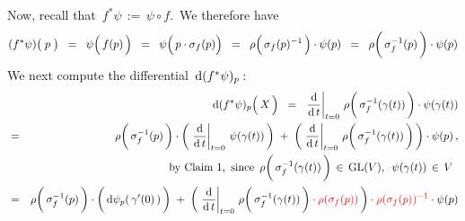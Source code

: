 \vskip 0.3cm
\noindent
Now, recall that \,$f^{*}\psi \,:=\, \psi \circ f$.\,
We therefore have
\begin{equation*}
(f^{*}\psi)\!\left(\;\overset{{\color{white}.}}{
    p
    }\;\right)
\;\; = \;\;
    \psi\!\left(\,\overset{{\color{white}.}}{
        f(p)
        }\,\right)
\;\; = \;\;
    \psi\!\left(\,\overset{{\color{white}.}}{
        p\cdot\sigma_{f}(p)
        }\right)
\;\; = \;\;
    \rho\!\left(\,\overset{{\color{white}.}}{
        \sigma_{f}(p)^{-1}
        }\,\right)
    \cdot
    \psi(p)
\;\; = \;\;
    \rho\!\left(\,\overset{{\color{white}.}}{
        \sigma_{f}^{-1}(p)
        }\,\right)
    \cdot
    \psi(p)
\end{equation*}
We next compute the differential \,$\textnormal{d}(f^{*}\psi)_{p}$\,:
\begin{eqnarray*}
&&
    \d(f^{*}\psi)_{p}\!\left(\,\overset{{\color{white}.}}{X}\,\right)
\;\; = \;\;
    \left.\dfrac{\d}{\d\,t}\right\vert_{t=0}
    \,
    \rho\!\left(\,\overset{{\color{white}.}}{
        \sigma_{f}^{-1}(\gamma(t))
        }\,\right)
    \cdot
    \psi(\gamma(t))
\\
& = &
    \rho\!\left(\,\overset{{\color{white}.}}{
        \sigma_{f}^{-1}(p)
        }\,\right)
    \cdot
    \left(\,
        \left.\dfrac{\d}{\d\,t}\right\vert_{t=0}
        \,
        \psi(\gamma(t))
        \,\right)
    \; + \;
    \left(\,
        \left.\dfrac{\d}{\d\,t}\right\vert_{t=0}
        \,
        \rho\!\left(\,\overset{{\color{white}.}}{
            \sigma_{f}^{-1}(\gamma(t))
            }\,\right)
        \,\right)
    \cdot
    \psi(p)\,,
\\
&&
    \quad
    \textnormal{by Claim 1,\, since
        \,$
        \rho\!\left(\,\overset{{\color{white}.}}{
            \sigma_{f}^{-1}(\gamma(t))
            }\,\right)
        \,\in\,
        \GL(V)
        $,\,
        \,$
        \psi(\gamma(t)) \,\in\, V
        $\,
        }
\\
& = &
    \rho\!\left(\,\overset{{\color{white}.}}{
        \sigma_{f}^{-1}(p)
        }\,\right)
    \cdot
    \left(\,\overset{{\color{white}1}}{
        \d\psi_{p}(\,\gamma^{\prime}(0)\,)
        }\,\right)
    \; + \;
    \left(\,
        \left.\dfrac{\d}{\d\,t}\right\vert_{t=0}
        \,
        \rho\!\left(\,\overset{{\color{white}.}}{
            \sigma_{f}^{-1}(\gamma(t))
            }\,\right)
        \cdot
        {\color{red}\rho(\sigma_{f}(p))}
        \,\right)
    \cdot
    {\color{red}\rho(\sigma_{f}(p))^{-1}}
    \cdot
    \psi(p)
\\

\end{eqnarray*}
